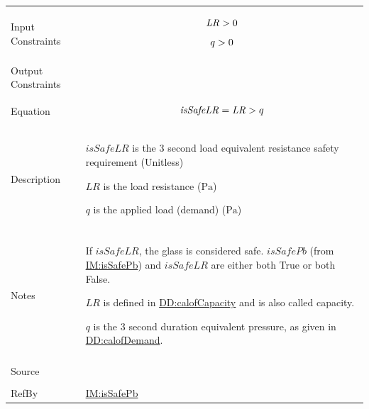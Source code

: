 \documentclass[12pt]{article}
\newcommand{\gt}{\ensuremath >}
\begin{document}
\begin{minipage}{\textwidth}
\begin{tabular}{>{\raggedright}p{}>{\raggedright\arraybackslash}p{}}
\\ \midrule \\
Input Constraints & \begin{displaymath}
                    \mathit{LR}\gt{}0
                    \end{displaymath}
                    \begin{displaymath}
                    q\gt{}0
                    \end{displaymath}
\\ \midrule \\
Output Constraints & 
\\ \midrule \\
Equation & \begin{displaymath}
           \mathit{isSafeLR}=\mathit{LR}\gt{}q
           \end{displaymath}
\\ \midrule \\
Description & \begin{symbDescription}
              \item{$\mathit{isSafeLR}$ is the 3 second load equivalent resistance safety requirement (Unitless)}
              \item{$\mathit{LR}$ is the load resistance (${\text{Pa}}$)}
              \item{$q$ is the applied load (demand) (${\text{Pa}}$)}
              \end{symbDescription}
\\ \midrule \\
Notes & If $\mathit{isSafeLR}$, the glass is considered safe. $\mathit{isSafePb}$ (from \hyperref[IM:isSafePb]{IM:isSafePb}) and $\mathit{isSafeLR}$ are either both True or both False.
        
        $\mathit{LR}$ is defined in \hyperref[DD:calofCapacity]{DD:calofCapacity} and is also called capacity.
        
        $q$ is the 3 second duration equivalent pressure, as given in \hyperref[DD:calofDemand]{DD:calofDemand}.
        
\\ \midrule \\
Source & \cite{astm2009}
         
\\ \midrule \\
RefBy & \hyperref[IM:isSafePb]{IM:isSafePb}
        
\\ \bottomrule
\end{tabular}
\end{minipage}
\end{document}
